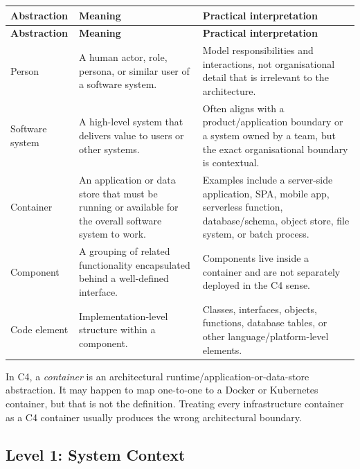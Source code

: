 \documentclass[11pt]{article}
\begin{document}
\begin{longtable}{>{\raggedright\arraybackslash}p{} >{\raggedright\arraybackslash}p{} >{\raggedright\arraybackslash}p{}}
\toprule
\textbf{Abstraction} & \textbf{Meaning} & \textbf{Practical interpretation} \\
\midrule
\endfirsthead
\toprule
\textbf{Abstraction} & \textbf{Meaning} & \textbf{Practical interpretation} \\
\midrule
\endhead
Person & A human actor, role, persona, or similar user of a software system. & Model responsibilities and interactions, not organisational detail that is irrelevant to the architecture. \\
Software system & A high-level system that delivers value to users or other systems. & Often aligns with a product/application boundary or a system owned by a team, but the exact organisational boundary is contextual.\cite{c4system} \\
Container & An application or data store that must be running or available for the overall software system to work. & Examples include a server-side application, SPA, mobile app, serverless function, database/schema, object store, file system, or batch process.\cite{c4containerabs} \\
Component & A grouping of related functionality encapsulated behind a well-defined interface. & Components live inside a container and are not separately deployed in the C4 sense.\cite{c4componentabs} \\
Code element & Implementation-level structure within a component. & Classes, interfaces, objects, functions, database tables, or other language/platform-level elements.\cite{c4code} \\
\bottomrule
\end{longtable}

\begin{warningbox}
In C4, a \emph{container} is an architectural runtime/application-or-data-store abstraction. It may happen to map one-to-one to a Docker or Kubernetes container, but that is not the definition. Treating every infrastructure container as a C4 container usually produces the wrong architectural boundary.\cite{c4containerabs}
\end{warningbox}

\subsection{Level 1: System Context}
\end{document}
